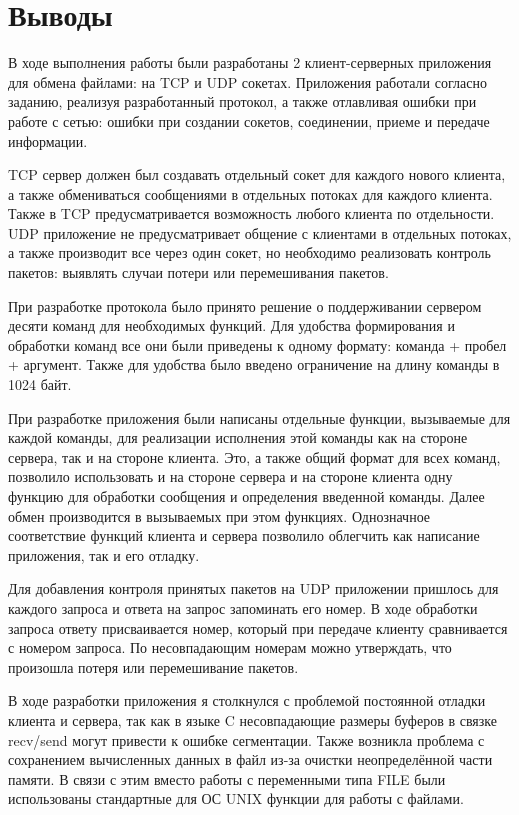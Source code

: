 \section{Выводы}
В ходе выполнения работы были разработаны 2 клиент-серверных приложения для обмена файлами: на TCP и UDP сокетах. Приложения работали согласно заданию, реализуя разработанный протокол, а также отлавливая ошибки при работе с сетью: ошибки при создании сокетов, соединении, приеме и передаче информации. 
 
TCP сервер должен был создавать отдельный сокет для каждого нового клиента, а также обмениваться сообщениями в отдельных потоках для каждого клиента. Также в TCP предусматривается возможность любого клиента по отдельности. UDP приложение не предусматривает общение с клиентами  в отдельных потоках, а также производит все через один сокет, но необходимо реализовать контроль пакетов: выявлять случаи потери или перемешивания пакетов.

При разработке протокола было принято решение о поддерживании сервером десяти команд для необходимых функций. Для удобства формирования и обработки команд все они были приведены к одному формату: команда + пробел + аргумент. Также для удобства было введено ограничение на длину команды в 1024 байт.

При разработке приложения были написаны отдельные функции, вызываемые для каждой команды, для реализации исполнения этой команды как на стороне сервера, так и на стороне клиента. Это, а также общий формат для всех команд, позволило использовать и на стороне сервера и на стороне клиента одну функцию для обработки сообщения и определения введенной команды. Далее обмен производится в вызываемых при этом функциях. Однозначное соответствие функций клиента и сервера позволило облегчить как написание приложения, так и его отладку.

Для добавления контроля принятых пакетов на UDP приложении пришлось для каждого запроса и ответа на запрос запоминать его номер. В ходе обработки запроса ответу присваивается номер, который при передаче клиенту сравнивается с номером запроса. По несовпадающим номерам можно утверждать, что произошла потеря или перемешивание пакетов.

В ходе разработки приложения я столкнулся с проблемой постоянной отладки клиента и сервера, так как в языке C несовпадающие размеры буферов в связке recv/send могут привести к ошибке сегментации. Также возникла проблема с сохранением вычисленных данных в файл из-за очистки неопределённой части памяти. В связи с этим вместо работы с переменными типа FILE были использованы стандартные для ОС UNIX функции для работы с файлами.

